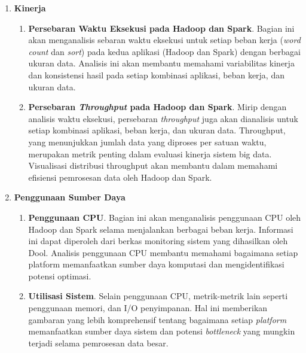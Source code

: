 \begin{enumerate}	
	\item \textbf{Kinerja}
	\begin{enumerate}
		\item \textbf{Persebaran Waktu Eksekusi pada Hadoop dan Spark}. Bagian ini akan menganalisis sebaran waktu eksekusi untuk setiap beban kerja (\textit{word count} dan \textit{sort}) pada kedua aplikasi (Hadoop dan Spark) dengan berbagai ukuran data. Analisis ini akan membantu memahami variabilitas kinerja dan konsistensi hasil pada setiap kombinasi aplikasi, beban kerja, dan ukuran data.
		\item \textbf{Persebaran \textit{Throughput} pada Hadoop dan Spark}. Mirip dengan analisis waktu eksekusi, persebaran \textit{throughput} juga akan dianalisis untuk setiap kombinasi aplikasi, beban kerja, dan ukuran data. Throughput, yang menunjukkan jumlah data yang diproses per satuan waktu,  merupakan metrik penting dalam evaluasi kinerja sistem big data.  Visualisasi distribusi throughput akan membantu dalam memahami efisiensi pemrosesan data oleh Hadoop dan Spark.
	\end{enumerate}
	\newpage
	\item \textbf{Penggunaan Sumber Daya}
	\begin{enumerate}
	\item \textbf{Penggunaan CPU}. Bagian ini akan menganalisis penggunaan CPU oleh Hadoop dan Spark selama menjalankan berbagai beban kerja.  Informasi ini dapat diperoleh dari berkas monitoring sistem yang dihasilkan oleh Dool.  Analisis penggunaan CPU membantu memahami bagaimana setiap platform memanfaatkan sumber daya komputasi dan mengidentifikasi potensi optimasi.
	\item \textbf{Utilisasi Sistem}. Selain penggunaan CPU, metrik-metrik lain seperti penggunaan memori, dan I/O penyimpanan. Hal ini memberikan gambaran yang lebih komprehensif tentang bagaimana setiap \textit{platform} memanfaatkan sumber daya sistem dan potensi \textit{bottleneck} yang mungkin terjadi selama pemrosesan data besar.
	\end{enumerate}
\end{enumerate}











